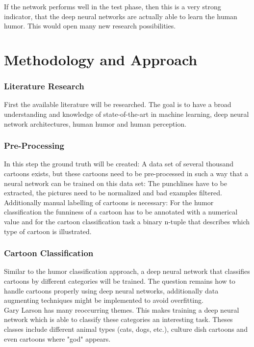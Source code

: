 \documentclass[draft,final]{vutinfth} %
\begin{document}
If the network performs well in the test phase, then this is a very strong indicator, that the deep neural networks are actually able to learn the human humor. This would open many new research possibilities. \\

\chapter{Methodology and Approach}
\subsection {Literature Research}
First the available literature will be researched. The goal is to have a broad understanding and knowledge of state-of-the-art in machine learning, deep neural network architectures, human humor and human perception. \\

\subsection {Pre-Processing}
In this step the ground truth will be created: A data set of several thousand cartoons exists, but these cartoons need to be pre-processed in such a way that a neural network can be trained on this data set: The punchlines have to be extracted, the pictures need to be normalized and bad examples filtered. Additionally manual labelling of cartoons is necessary: For the humor classification the funniness of a cartoon has to be annotated with a numerical value and for the cartoon classification task a binary n-tuple that describes which type of cartoon is illustrated. \\

\subsection {Cartoon Classification}

Similar to the humor classification approach, a deep neural network that classifies cartoons by different categories will be trained. The question remains how to handle cartoons properly using deep neural networks, additionally data augmenting techniques might be implemented to avoid overfitting. \\

Gary Larson has many reoccurring themes. This makes training a deep neural network which is able to classify these categories an interesting task. Theses classes include different animal types (cats, dogs, etc.), culture dish cartoons and even cartoons where "god" appears. \\
\end{document}
